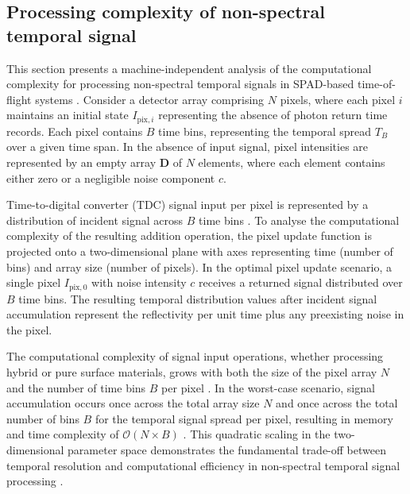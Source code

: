\documentclass[12pt,a4paper,oneside]{report}
\begin{document}
\subsection{Processing complexity of non-spectral temporal signal}
\label{subsec:processing_complexity_non-spectral_temporal}

This section presents a machine-independent analysis of the computational complexity for processing non-spectral temporal signals in SPAD-based time-of-flight systems \cite{piron2020}. Consider a detector array comprising $N$ pixels, where each pixel $i$ maintains an initial state $I_{\text{pix},i}$ representing the absence of photon return time records. Each pixel contains $B$ time bins, representing the temporal spread $T_B$ over a given time span. In the absence of input signal, pixel intensities are represented by an empty array $\mathbf{D}$ of $N$ elements, where each element contains either zero or a negligible noise component $c$.

Time-to-digital converter (TDC) signal input per pixel is represented by a distribution of incident signal across $B$ time bins \cite{sesta2023,alabbas2018}. To analyse the computational complexity of the resulting addition operation, the pixel update function is projected onto a two-dimensional plane with axes representing time (number of bins) and array size (number of pixels). In the optimal pixel update scenario, a single pixel $I_{\text{pix},0}$ with noise intensity $c$ receives a returned signal distributed over $B$ time bins. The resulting temporal distribution values after incident signal accumulation represent the reflectivity per unit time plus any preexisting noise in the pixel.

The computational complexity of signal input operations, whether processing hybrid or pure surface materials, grows with both the size of the pixel array $N$ and the number of time bins $B$ per pixel \cite{knuth1976}. In the worst-case scenario, signal accumulation occurs once across the total array size $N$ and once across the total number of bins $B$ for the temporal signal spread per pixel, resulting in memory and time complexity of $\mathcal{O}(N \times B)$ \cite{knuth1976}. This quadratic scaling in the two-dimensional parameter space demonstrates the fundamental trade-off between temporal resolution and computational efficiency in non-spectral temporal signal processing \cite{su2016}.
\end{document}

